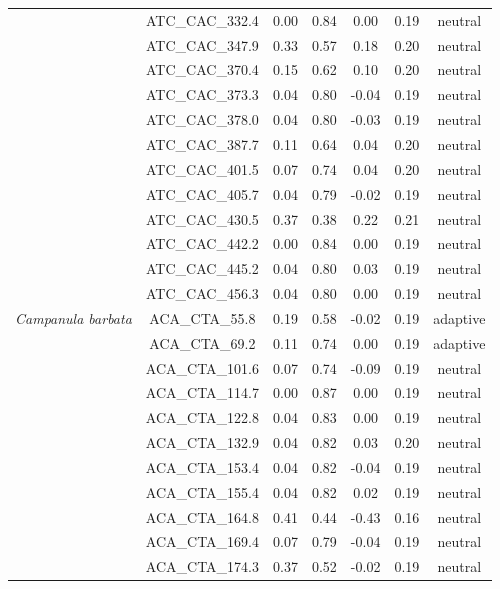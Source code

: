 \documentclass[11pt,]{article}
\begin{document}
\begin{longtable}[c]{@{}lcccccc@{}}
\\\addlinespace
& ATC\_CAC\_332.4 & 0.00 & 0.84 & 0.00 & 0.19 & neutral
\\\addlinespace
& ATC\_CAC\_347.9 & 0.33 & 0.57 & 0.18 & 0.20 & neutral
\\\addlinespace
& ATC\_CAC\_370.4 & 0.15 & 0.62 & 0.10 & 0.20 & neutral
\\\addlinespace
& ATC\_CAC\_373.3 & 0.04 & 0.80 & -0.04 & 0.19 & neutral
\\\addlinespace
& ATC\_CAC\_378.0 & 0.04 & 0.80 & -0.03 & 0.19 & neutral
\\\addlinespace
& ATC\_CAC\_387.7 & 0.11 & 0.64 & 0.04 & 0.20 & neutral
\\\addlinespace
& ATC\_CAC\_401.5 & 0.07 & 0.74 & 0.04 & 0.20 & neutral
\\\addlinespace
& ATC\_CAC\_405.7 & 0.04 & 0.79 & -0.02 & 0.19 & neutral
\\\addlinespace
& ATC\_CAC\_430.5 & 0.37 & 0.38 & 0.22 & 0.21 & neutral
\\\addlinespace
& ATC\_CAC\_442.2 & 0.00 & 0.84 & 0.00 & 0.19 & neutral
\\\addlinespace
& ATC\_CAC\_445.2 & 0.04 & 0.80 & 0.03 & 0.19 & neutral
\\\addlinespace
& ATC\_CAC\_456.3 & 0.04 & 0.80 & 0.00 & 0.19 & neutral
\\\addlinespace
\textit{Campanula barbata} & ACA\_CTA\_55.8 & 0.19 & 0.58 & -0.02 & 0.19
& adaptive
\\\addlinespace
& ACA\_CTA\_69.2 & 0.11 & 0.74 & 0.00 & 0.19 & adaptive
\\\addlinespace
& ACA\_CTA\_101.6 & 0.07 & 0.74 & -0.09 & 0.19 & neutral
\\\addlinespace
& ACA\_CTA\_114.7 & 0.00 & 0.87 & 0.00 & 0.19 & neutral
\\\addlinespace
& ACA\_CTA\_122.8 & 0.04 & 0.83 & 0.00 & 0.19 & neutral
\\\addlinespace
& ACA\_CTA\_132.9 & 0.04 & 0.82 & 0.03 & 0.20 & neutral
\\\addlinespace
& ACA\_CTA\_153.4 & 0.04 & 0.82 & -0.04 & 0.19 & neutral
\\\addlinespace
& ACA\_CTA\_155.4 & 0.04 & 0.82 & 0.02 & 0.19 & neutral
\\\addlinespace
& ACA\_CTA\_164.8 & 0.41 & 0.44 & -0.43 & 0.16 & neutral
\\\addlinespace
& ACA\_CTA\_169.4 & 0.07 & 0.79 & -0.04 & 0.19 & neutral
\\\addlinespace
& ACA\_CTA\_174.3 & 0.37 & 0.52 & -0.02 & 0.19 & neutral

\end{longtable}
\end{document}
